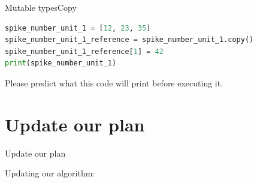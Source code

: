 \documentclass[aspectratio=169]{beamer}
\begin{document}
\begin{frame}[fragile]{Mutable types}{Copy}

\begin{lstlisting}[language=Python, frame=single]
spike_number_unit_1 = [12, 23, 35]
spike_number_unit_1_reference = spike_number_unit_1.copy()
spike_number_unit_1_reference[1] = 42
print(spike_number_unit_1)
\end{lstlisting}

Please predict what this code will print before executing it.

\end{frame}

\section{Update our plan}
\begin{frame}{Update our plan}

Updating our algorithm:


\end{frame}
\end{document}
